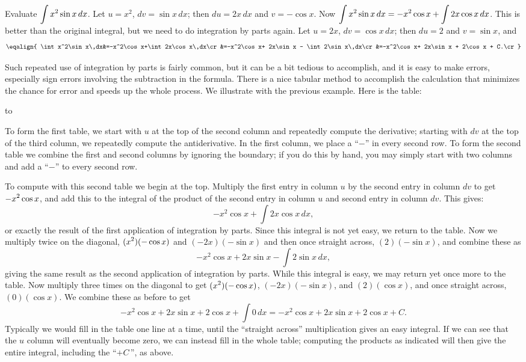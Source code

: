 \example
Evaluate $\displaystyle\int x^2\sin x\,dx$. 
Let $u=x^2$, $dv=\sin x\,dx$; then $du=2x\,dx$ and $v=-\cos x$. 
Now $\displaystyle \int x^2\sin x\,dx=-x^2\cos x+\int 2x\cos x\,dx$. This is
better than the original integral, but we need to do integration by
parts again. Let $u=2x$, $dv=\cos x\,dx$; then
$du=2$ and $v=\sin x$, and
$$\eqalign{
  \int x^2\sin x\,dx&=-x^2\cos x+\int 2x\cos x\,dx\cr
  &=-x^2\cos x+ 2x\sin x - \int 2\sin x\,dx\cr
  &=-x^2\cos x+ 2x\sin x + 2\cos x + C.\cr
}$$
\vskip-10pt
\endexample

Such repeated use of integration by parts is fairly common, but it can
be a bit tedious to accomplish, and it is easy to make
errors, especially sign errors involving the subtraction in the
formula. There is a nice tabular method to accomplish the calculation
that minimizes the chance for error and speeds up the whole
process. We illustrate with the previous example. Here is the
table:

\texonly
{}
\null
\hbox to
\endtexonly
{}

To form the first table, we start with $u$ at the top of the second
column and repeatedly compute the derivative; starting with $dv$ at
the top of the third column, we repeatedly compute the
antiderivative. In the first column, we place a ``$-$'' in every
second row. To form the 
second table we combine the first and second columns by
ignoring the boundary; if you do this by hand, you may simply start
with two columns and add a ``$-$'' to every second row.

To compute with this second table we begin at the top. Multiply the
first entry in column $u$ by the second entry in column $dv$ to get
$\displaystyle -x^2\cos x$, and add this to the integral of the product of the
second entry in column $u$ and second entry in column $dv$.  This
gives:
$$-x^2\cos x+\int 2x\cos x\,dx,$$
or exactly the result of the first application of integration by
parts.  Since this integral is not yet easy, we return to the table.
Now we multiply twice on the diagonal, $\displaystyle (x^2)(-\cos x)$ and
$(-2x)(-\sin x)$ and then once straight across, $(2)(-\sin x)$, and
combine these as
$$-x^2\cos x+2x\sin x-\int 2\sin x\,dx,$$
giving the same result as the second application of integration by
parts. While this integral is easy, we may return yet once more to the
table. Now multiply three times on the diagonal to get $\displaystyle
(x^2)(-\cos x)$, $(-2x)(-\sin x)$, and $(2)(\cos x)$, and once
straight across, $(0)(\cos x)$. We combine these as before to get
$$
  -x^2\cos x+2x\sin x +2\cos x+\int 0\,dx=
  -x^2\cos x+2x\sin x +2\cos x+C.
$$
Typically we would fill in the table one line at a time, until the
``straight across'' multiplication gives an easy integral. If we can
see that the $u$ column will eventually become zero, we can instead
fill in the whole table; computing the products as indicated will then
give the entire integral, including the ``$+C\,$'', as above.

